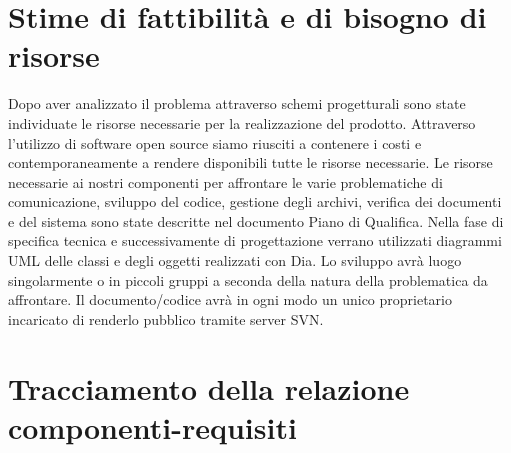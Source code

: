 \documentclass[11pt,titlepage,a4paper]{report}
\begin{document}

\chapter{Stime di fattibilit\`a e di bisogno di risorse}
Dopo aver analizzato il problema attraverso schemi progetturali sono state individuate le risorse necessarie  per la realizzazione del prodotto. Attraverso l'utilizzo di software open source siamo riusciti a contenere i costi e contemporaneamente a rendere disponibili tutte le risorse necessarie.
Le risorse necessarie ai nostri componenti per affrontare le varie problematiche di comunicazione, sviluppo del codice, gestione degli archivi, verifica dei documenti e del sistema sono state descritte nel documento Piano di Qualifica. Nella fase di specifica tecnica e successivamente di progettazione verrano utilizzati diagrammi UML delle classi e degli oggetti realizzati con Dia. Lo sviluppo avr\`a luogo singolarmente o in piccoli gruppi a seconda della natura della problematica da affrontare. Il documento/codice avr\`a in ogni modo un unico proprietario incaricato di renderlo pubblico tramite server SVN.
\chapter{Tracciamento della relazione componenti-requisiti}
\end{document}
